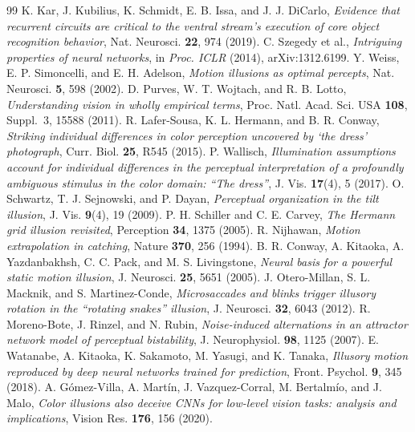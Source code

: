 \begin{thebibliography}{99}
 K. Kar, J. Kubilius, K. Schmidt, E. B. Issa, and J. J. DiCarlo, \emph{Evidence that recurrent circuits are critical to the ventral stream's execution of core object recognition behavior}, Nat. Neurosci. \textbf{22}, 974 (2019).
 C. Szegedy et al., \emph{Intriguing properties of neural networks}, in \emph{Proc. ICLR} (2014), arXiv:1312.6199.
 Y. Weiss, E. P. Simoncelli, and E. H. Adelson, \emph{Motion illusions as optimal percepts}, Nat. Neurosci. \textbf{5}, 598 (2002).
 D. Purves, W. T. Wojtach, and R. B. Lotto, \emph{Understanding vision in wholly empirical terms}, Proc. Natl. Acad. Sci. USA \textbf{108}, Suppl.~3, 15588 (2011).
 R. Lafer-Sousa, K. L. Hermann, and B. R. Conway, \emph{Striking individual differences in color perception uncovered by `the dress' photograph}, Curr. Biol. \textbf{25}, R545 (2015).
 P. Wallisch, \emph{Illumination assumptions account for individual differences in the perceptual interpretation of a profoundly ambiguous stimulus in the color domain: ``The dress''}, J. Vis. \textbf{17}(4), 5 (2017).
 O. Schwartz, T. J. Sejnowski, and P. Dayan, \emph{Perceptual organization in the tilt illusion}, J. Vis. \textbf{9}(4), 19 (2009).
 P. H. Schiller and C. E. Carvey, \emph{The Hermann grid illusion revisited}, Perception \textbf{34}, 1375 (2005).
 R. Nijhawan, \emph{Motion extrapolation in catching}, Nature \textbf{370}, 256 (1994).
 B. R. Conway, A. Kitaoka, A. Yazdanbakhsh, C. C. Pack, and M. S. Livingstone, \emph{Neural basis for a powerful static motion illusion}, J. Neurosci. \textbf{25}, 5651 (2005).
 J. Otero-Millan, S. L. Macknik, and S. Martinez-Conde, \emph{Microsaccades and blinks trigger illusory rotation in the ``rotating snakes'' illusion}, J. Neurosci. \textbf{32}, 6043 (2012).
 R. Moreno-Bote, J. Rinzel, and N. Rubin, \emph{Noise-induced alternations in an attractor network model of perceptual bistability}, J. Neurophysiol. \textbf{98}, 1125 (2007).
 E. Watanabe, A. Kitaoka, K. Sakamoto, M. Yasugi, and K. Tanaka, \emph{Illusory motion reproduced by deep neural networks trained for prediction}, Front. Psychol. \textbf{9}, 345 (2018).
 A. G\'omez-Villa, A. Mart\'in, J. Vazquez-Corral, M. Bertalm\'io, and J. Malo, \emph{Color illusions also deceive CNNs for low-level vision tasks: analysis and implications}, Vision Res. \textbf{176}, 156 (2020).

\end{thebibliography}
